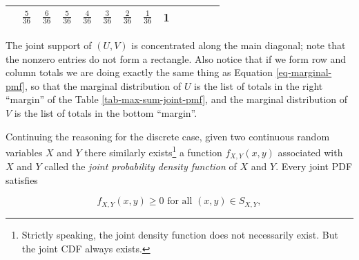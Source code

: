 \documentclass[]{book}
\let\rmarkdownfootnote\footnote%
\def\footnote{\protect\rmarkdownfootnote}
\numberwithin{equation}{chapter}
\numberwithin{figure}{chapter}
\theoremstyle{plain}
\theoremstyle{definition}
\theoremstyle{remark}
\theoremstyle{definition}
\theoremstyle{definition}
\theoremstyle{remark}
\begin{document}
\begin{longtable}[]{@{}lllllllllllll@{}}
\begin{minipage}[t]{0.05\columnwidth}
\end{minipage} & \begin{minipage}[t]{0.05\columnwidth}\raggedright\strut
\(\frac{5}{36}\)\strut
\end{minipage} & \begin{minipage}[t]{0.05\columnwidth}\raggedright\strut
\(\frac{6}{36}\)\strut
\end{minipage} & \begin{minipage}[t]{0.05\columnwidth}\raggedright\strut
\(\frac{5}{36}\)\strut
\end{minipage} & \begin{minipage}[t]{0.05\columnwidth}\raggedright\strut
\(\frac{4}{36}\)\strut
\end{minipage} & \begin{minipage}[t]{0.05\columnwidth}\raggedright\strut
\(\frac{3}{36}\)\strut
\end{minipage} & \begin{minipage}[t]{0.05\columnwidth}\raggedright\strut
\(\frac{2}{36}\)\strut
\end{minipage} & \begin{minipage}[t]{0.05\columnwidth}\raggedright\strut
\(\frac{1}{36}\)\strut
\end{minipage} & \begin{minipage}[t]{0.06\columnwidth}\raggedright\strut
1\strut
\end{minipage}\tabularnewline
\bottomrule
\end{longtable}

The joint support of \((U,V)\) is concentrated along the main diagonal;
note that the nonzero entries do not form a rectangle. Also notice that
if we form row and column totals we are doing exactly the same thing as
Equation \eqref{eq-marginal-pmf}, so that the marginal distribution of
\(U\) is the list of totals in the right ``margin'' of the Table
\ref{tab-max-sum-joint-pmf}, and the marginal distribution of \(V\) is
the list of totals in the bottom ``margin''.

Continuing the reasoning for the discrete case, given two continuous
random variables \(X\) and \(Y\) there similarly exists\footnote{Strictly
  speaking, the joint density function does not necessarily exist. But
  the joint CDF always exists.} a function \(f_{X,Y}(x,y)\) associated
with \(X\) and \(Y\) called the \emph{joint probability density
function} of \(X\) and \(Y\). Every joint PDF satisfies

\begin{equation}
f_{X,Y}(x,y)\geq0\mbox{ for all }(x,y)\in S_{X,Y},
\end{equation}
\end{document}
